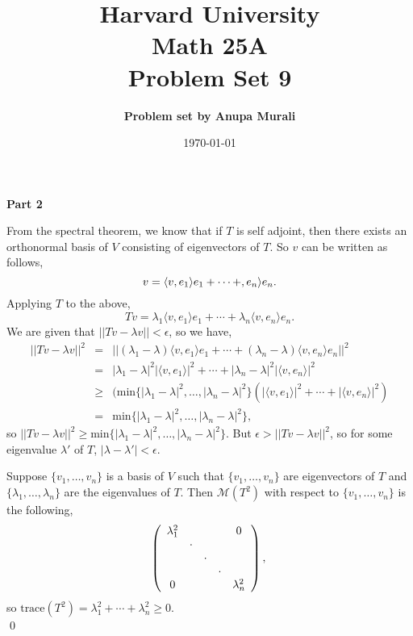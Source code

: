 \documentclass[12pt]{article}
\title{\bf \large Harvard University \\ Math 25A \\ \vspace{0.2in} Problem Set 9}
\author{ \bf \large Problem set by  Anupa Murali}
\date{\today}
\newcommand{\problem}[1]{\vspace{0.3in} \noindent {\bf Problem #1}}
\begin{document}
\maketitle

\thispagestyle{empty}



\vspace{0.35in}

\centerline{\bf \large Part 2}
\problem{1} From the spectral theorem, we know that if $T$ is self adjoint, then there exists an orthonormal basis of $V$ consisting of eigenvectors of $T$. So $v$ can be written as follows,
$$
v = \langle v, e_1 \rangle e_1 + \cdots + \label v, e_n \rangle e_n.
$$
Applying $T$ to the above,
$$
Tv = \lambda_1\langle v, e_1 \rangle e_1 + \cdots + \lambda_n\langle v, e_n \rangle e_n.
$$
We are given that $||Tv - \lambda v || < \epsilon$, so we have,
\begin{eqnarray*}
||Tv - \lambda v ||^2 &=& ||(\lambda_1 - \lambda)\langle v, e_1 \rangle e_1 + \cdots + (\lambda_n- \lambda)\langle v, e_n \rangle e_n||^2\\
&=& |\lambda_1 - \lambda|^2|\langle v, e_1 \rangle|^2 + \cdots + |\lambda_n- \lambda|^2|\langle v, e_n \rangle|^2\\
&\ge& (\text{min} \{|\lambda_1 - \lambda|^2, \ldots, |\lambda_n - \lambda|^2\}(|\langle v, e_1 \rangle|^2 + \cdots + |\langle v, e_n \rangle|^2)\\
&=& \text{min}\{|\lambda_1 - \lambda|^2, \ldots, |\lambda_n - \lambda|^2\},
\end{eqnarray*}
so $||Tv - \lambda v ||^2 \ge \text{min}\{|\lambda_1 - \lambda|^2, \ldots, |\lambda_n - \lambda|^2\}$. But $\epsilon > ||Tv - \lambda v ||^2$, so for some eigenvalue $\lambda'$ of $T$, $|\lambda - \lambda'| < \epsilon$.

\problem{2} Suppose $\{v_1, \ldots, v_n\}$ is a basis of $V$ such that $\{v_1, \ldots, v_n\}$ are eigenvectors of $T$ and $\{\lambda_1, \ldots, \lambda_n\}$ are the eigenvalues of $T$. Then $\mathcal{M}(T^2)$ with respect to $ \{v_1, \ldots, v_n\}$ is the following,
$$
\left(
 \begin{array}{ccccc}
   \lambda_1^2 & && &0 \\
    &\cdot & & &\\
    & & \cdot& &\\
    & & & \cdot&\\
    0& & & &\lambda_n^2 \\
 \end{array}
\right),\\
$$
so $\text{trace}(T^2) = \lambda_1^2 + \cdots + \lambda_n^2 \ge 0$.\\
\qed
\end{document}
